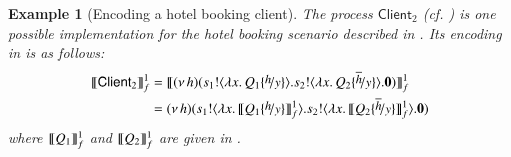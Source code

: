 \documentclass[preprint,11pt]{elsarticle}
\newtheorem{example}{Example}[section]
\newcommand{\Client}{\mathsf{Client}}
\begin{document}
{{%


\begin{example}[Encoding a hotel booking client]
\label{ex:hotel}
The \HOp process $\Client_2$ (cf. ) is one possible implementation for the 
hotel booking scenario described in 
. Its encoding in \HO is as follows:
\begin{align*}
\pmap{\Client_2}{1}_f & = \pmap{\newsp{h}{\bout{s_1}{\abs{x}{Q_1 \subst{h}{y}}} \bout{s_2}{\abs{x}{Q_2 \subst{\dual{h}}{y}}} \inact}}{1}_f
\\
 & = \newsp{h}{\bout{s_1}{\abs{x}{\pmap{Q_1 \subst{h}{y}}{1}_f}} \bout{s_2}{\abs{x}{\pmap{Q_2 \subst{\dual{h}}{y}}{1}_f} }\inact}
\end{align*}
where $\llbracket Q_1\rrbracket^1_f$ and $\llbracket Q_2\rrbracket^1_f$ are given in .
\end{example}

}}
\end{document}
